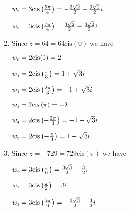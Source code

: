 \documentclass{ximera}
\begin{document}
\begin{enumerate}
\begin{multicols}{2}
\end{multicols}

\begin{multicols}{2}

$w_{\text{\tiny$2$}} = 3\text{cis}\left(\frac{5\pi}{4}\right) =-\frac{3\sqrt{2}}{2} - \frac{3\sqrt{2}}{2}i$

$w_{\text{\tiny$3$}} = 3\text{cis}\left(\frac{7\pi}{4}\right) =\frac{3\sqrt{2}}{2} - \frac{3\sqrt{2}}{2}i$

\end{multicols}





\item Since $z = 64 = 64\text{cis}(0)$ we have 


\begin{multicols}{3}

$w_{\text{\tiny$0$}} = 2\text{cis}(0) = 2$

$w_{\text{\tiny$1$}} = 2\text{cis}\left(\frac{\pi}{3}\right) = 1 + \sqrt{3}i$

$w_{\text{\tiny$2$}} = 2\text{cis}\left(\frac{2\pi}{3}\right) = -1 + \sqrt{3}i$

\end{multicols}

\begin{multicols}{3}

$w_{\text{\tiny$3$}} = 2\text{cis}\left(\pi\right) = -2$

$w_{\text{\tiny$4$}} = 2\text{cis}\left(-\frac{2\pi}{3}\right) = -1 - \sqrt{3}i$

$w_{\text{\tiny$5$}} = 2\text{cis}\left(-\frac{\pi}{3}\right) = 1 - \sqrt{3}i$

\end{multicols}


\item Since $z = -729 = 729 \text{cis}(\pi)$ we have 


\begin{multicols}{3}

$w_{\text{\tiny$0$}} = 3\text{cis}\left(\frac{\pi}{6}\right) = \frac{3\sqrt{3}}{2} + \frac{3}{2}i$

$w_{\text{\tiny$1$}} = 3\text{cis}\left(\frac{\pi}{2}\right) = 3i$

$w_{\text{\tiny$2$}} = 3\text{cis}\left(\frac{5\pi}{6}\right) = -\frac{3\sqrt{3}}{2} + \frac{3}{2}i$

\end{multicols}

\begin{multicols}{3}


\end{multicols}
\end{enumerate}
\end{document}
